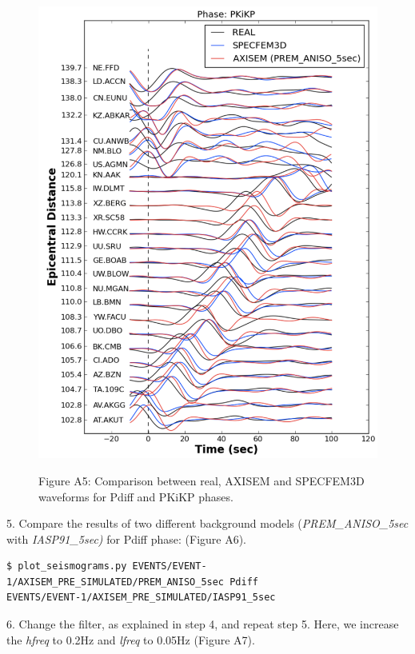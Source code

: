 \documentclass{article}
\begin{document}
\begin{figure}
\begin{minipage}{.5\textwidth}
  \includegraphics[width=1.\linewidth]{AXISEMTutorial-fig011.pdf}
\end{minipage}
\begin{center}
{\small{}Figure A5: Comparison between real, AXISEM and SPECFEM3D waveforms for 
Pdiff and PKiKP phases.}
\end{center}
\end{figure}

5. Compare the results of two different background models (\textit{PREM\_ANISO\_5sec} with 
\textit{IASP91\_5sec)} for Pdiff phase: (Figure A6).

\begin{lstlisting}
$ plot_seismograms.py EVENTS/EVENT-1/AXISEM_PRE_SIMULATED/PREM_ANISO_5sec Pdiff 
EVENTS/EVENT-1/AXISEM_PRE_SIMULATED/IASP91_5sec
\end{lstlisting}

6. Change the filter, as explained in step 4, and repeat step 5. Here, we increase 
the \textit{hfreq} to 0.2Hz and \textit{lfreq} to 0.05Hz (Figure A7).
\end{document}
